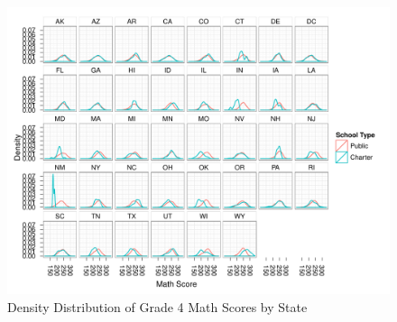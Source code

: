 \documentclass[letterpaper,12p,twoside]{article} %
\begin{document}
\begin{singlespace}

 \clearpage
 \clearpage
\begin{figure}[h]
\begin{center}
\includegraphics[height=\textwidth,angle=90]{../Figures/g4mathDensityByState.pdf}
\caption{Density Distribution of Grade 4 Math Scores by State}
\label{fig:g4math:density}
\end{center}
\end{figure}
\clearpage


\end{singlespace}
\end{document}
